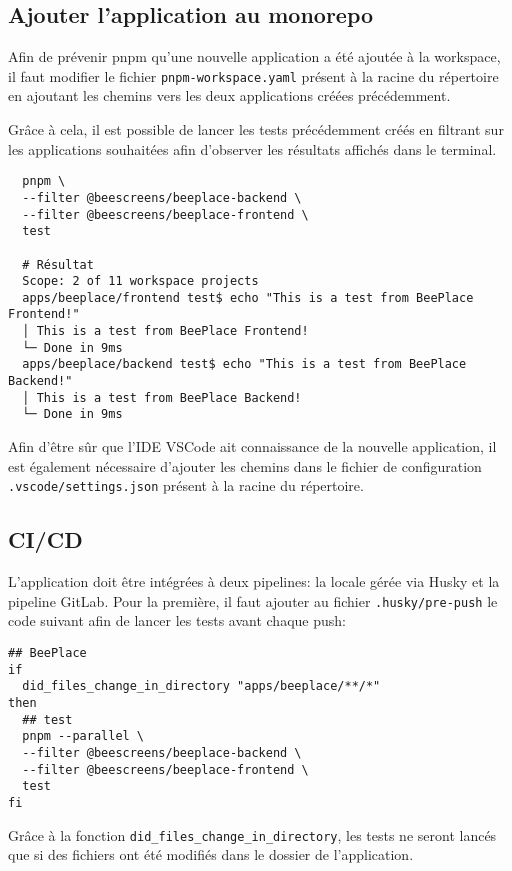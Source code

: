 \subsection{Ajouter l'application au monorepo}

Afin de prévenir pnpm qu'une nouvelle application a été ajoutée à la workspace, il faut modifier le fichier \texttt{pnpm-workspace.yaml} présent à la racine du répertoire en ajoutant les chemins vers les deux applications créées précédemment.


Grâce à cela, il est possible de lancer les tests précédemment créés en filtrant sur les applications souhaitées afin d'observer les résultats affichés dans le terminal.

\begin{verbatim}
  pnpm \
  --filter @beescreens/beeplace-backend \
  --filter @beescreens/beeplace-frontend \
  test

  # Résultat
  Scope: 2 of 11 workspace projects
  apps/beeplace/frontend test$ echo "This is a test from BeePlace Frontend!"
  │ This is a test from BeePlace Frontend!
  └─ Done in 9ms
  apps/beeplace/backend test$ echo "This is a test from BeePlace Backend!"
  │ This is a test from BeePlace Backend!
  └─ Done in 9ms
\end{verbatim}

Afin d'être sûr que l'IDE VSCode ait connaissance de la nouvelle application, il est également nécessaire d'ajouter les chemins dans le fichier de configuration \texttt{.vscode/settings.json} présent à la racine du répertoire.

\subsection{CI/CD}

L'application doit être intégrées à deux pipelines: la locale gérée via Husky et la pipeline GitLab. Pour la première, il faut ajouter au fichier \texttt{.husky/pre-push} le code suivant afin de lancer les tests avant chaque push:

\begin{verbatim}
## BeePlace
if
  did_files_change_in_directory "apps/beeplace/**/*"
then
  ## test
  pnpm --parallel \
  --filter @beescreens/beeplace-backend \
  --filter @beescreens/beeplace-frontend \
  test
fi
\end{verbatim}

Grâce à la fonction \texttt{did_files_change_in_directory}, les tests ne seront lancés que si des fichiers ont été modifiés dans le dossier de l'application.

